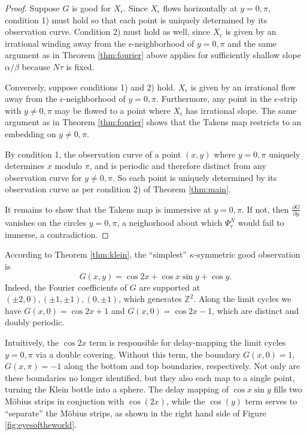 \documentclass[11pt]{article}
\theoremstyle{definition}
\theoremstyle{remark}
\newcommand{\ZZ}{\mathbb{Z}}
\begin{document}
    \begin{proof}
    Suppose $G$ is good for $X_\epsilon$. Since $X_\epsilon$ flows horizontally at $y=0,\pi$, condition 1) must hold so that each point is uniquely determined by its observation curve. Condition 2) must hold as well, since $X_\epsilon$ is given by an irrational winding away from
    the $\epsilon$-neighborhood of $y=0,\pi$ and the same argument as in Theorem \ref{thm:fourier} above applies for sufficiently shallow slope $\alpha/\beta$ because $N\tau$ is fixed.

    Conversely, suppose conditions 1) and 2) hold. $X_\epsilon$ is given by an irrational flow away from the $\epsilon$-neighborhood of $y=0,\pi$. Furthermore, any point in the $\epsilon$-strip with $y\neq 0,\pi$ may be flowed to a point where $X_\epsilon$ has irrational slope. The same argument as in Theorem \ref{thm:fourier} shows that the Takens map restricts to an embedding on $y\neq 0, \pi$.

    By condition 1, the observation curve of a point $(x,y)$ where $y=0,\pi$ uniquely determines $x$ modulo $\pi$, and is periodic and therefore distinct from any observation curve for $y\neq 0,\pi$. So each point is uniquely determined by its observation curve as per condition 2) of Theorem \ref{thm:main}.

    It remains to show that the Takens map is immersive at $y=0,\pi$. If not, then $\frac{\partial G}{\partial y}$ vanishes on the circles $y=0,\pi$, a neighorhood about which $\Psi_\tau^N$ would fail to immerse, a contradiction.
    \end{proof}

    According to Theorem \ref{thm:klein}, the ``simplest'' $\kappa$-symmetric good observation is
    \begin{equation}
    \label{eq:kleinfourier}
    G(x,y) = \cos 2x + \cos x\sin y + \cos y.
    \end{equation}
    Indeed, the Fourier coefficients of $G$ are supported at $(\pm2,0), (\pm1, \pm1), (0, \pm1)$, which generates $\ZZ^2$. Along the limit cycles we have $G(x, 0) = \cos 2x + 1$ and $G(x,0) = \cos 2x - 1$, which are distinct and doubly periodic.

    Intuitively, the $\cos 2x$ term is responsible for delay-mapping the limit cycles $y=0,\pi$ via a double covering.  Without this term, the boundary $G(x, 0) = 1$, $G(x, \pi) = -1$ along the bottom and top boundaries, respectively.  Not only are these boundaries no longer identified, but they also each map to a single point, turning the Klein bottle into a sphere.  The delay mapping of $\cos x\sin y$ fills two M\"{o}bius strips in conjuction with $\cos(2x)$, while the $\cos(y)$ term serves to ``separate'' the M\"{o}bius strips, as shown in the right hand side of Figure \ref{fig:eyesoftheworld}.
\end{document}
